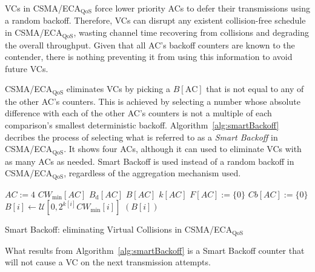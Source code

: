 \documentclass[a4paper]{article}
\begin{document}
VCs in CSMA/ECA$_{\text{QoS}}$ force lower priority ACs to defer their transmissions using a random backoff. Therefore, VCs can disrupt any existent collision-free schedule in CSMA/ECA$_{\text{QoS}}$, wasting channel time recovering from collisions and degrading the overall throughput. Given that all AC's backoff counters are known to the contender, there is nothing preventing it from using this information to avoid future VCs.

CSMA/ECA$_{\text{QoS}}$ eliminates VCs by picking a $B[\text{AC}]$ that is not equal to any of the other AC's counters. This is achieved by selecting a number whose absolute difference with each of the other AC's counters is not a multiple of each comparison's smallest deterministic backoff. Algorithm~\ref{alg:smartBackoff} decribes the process of selecting what is referred to as a \emph{Smart Backoff} in CSMA/ECA$_{\text{QoS}}$. It shows four ACs, although it can used to eliminate VCs with as many ACs as needed. Smart Backoff is used instead of a random backoff in CSMA/ECA$_{\text{QoS}}$, regardless of the aggregation mechanism used.



\begin{center}
\begin{minipage}{0.7\linewidth}
	\begin{algorithm}[H]
		$AC:=4$
		$CW_{\min}[AC]$
		$B_{\text{d}}[AC]$
		$B[AC]$
		$k[AC]$
		$F[AC]:=\{0\}$\;
		$Cb[AC]:=\{0\}$\;
		\tcp{}\tcp{}
		{
			$B[i]\gets\mathcal{U}[0,2^{k[i]}{CW_{\min}[i]}]$\;
			{
			}
		}
		\Return $(B[i])$\;
		\vspace{0.2cm}
		\caption{Smart Backoff: eliminating Virtual Collisions in CSMA/ECA$_{\text{QoS}}$}
		\label{alg:smartBackoff}
	\end{algorithm}
\end{minipage}
\end{center}

What results from Algorithm~\ref{alg:smartBackoff} is a Smart Backoff counter that will not cause a VC on the next transmission attempts.
\end{document}
